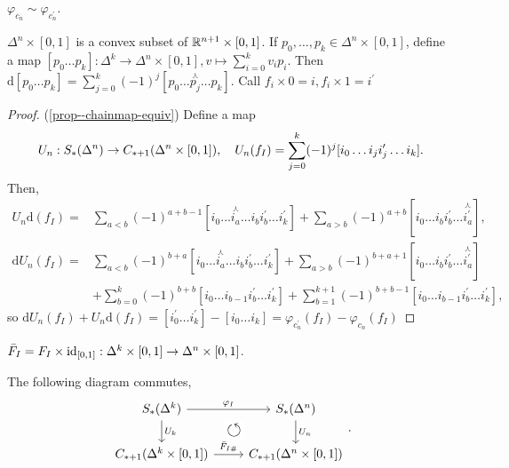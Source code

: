 \documentclass[a4paper,11pt]{article}
\begin{document}
			\begin{prop}\label{prop--chainmap-equiv}
				$\varphi_{c_{n}}\sim\varphi_{c^\prime_n}$.
			\end{prop}

			 $\Delta^n\times[0,1]$ is a convex subset of $\R^{n+1}\times[0,1]$. If $p_0,\dots,p_k\in\Delta^n\times[0,1]$, define a map $[p_0\dots p_k]:\Delta^k\rightarrow \Delta^n\times[0,1],v\mapsto\sum_{i=0}^{k}v_ip_i$. Then $\mathrm{d}[p_0\dots p_k]=\sum_{j=0}^{k}(-1)^{j}[p_0\dots \overset{\curlywedge}{p_j}\dots p_k]$. Call $f_i\times0=i, f_i\times1=i^\prime$

			\begin{proof}(\autoref{prop--chainmap-equiv})
				Define a map
				\begin{equation*}
					U_n:S_\ast(\Delta^n)\rightarrow \cx[\ast+1]{\Delta^n\times[0,1]},\quad U_n(f_I)=\sum_{j=0}^{k}(-1)^{j}[i_0\dots i_j i^\prime_j\dots i_k].
				\end{equation*}
				Then,
				\begin{align*}
					U_n\mathrm{d}(f_I)=&\sum_{a<b}(-1)^{a+b-1}[i_0\dots \overset{\curlywedge}{i_a}\dots i_bi^\prime_b\dots i^\prime_k]+\sum_{a>b}(-1)^{a+b}[i_0\dots i_bi^\prime_b\dots\overset{\curlywedge}{i^\prime_a}],\\
					\mathrm{d}U_n(f_I)=&\sum_{a<b}(-1)^{b+a}[i_0\dots\overset{\curlywedge}{i_a}\dots i_bi^\prime_b\dots i^\prime_k]+\sum_{a>b}(-1)^{b+a+1}[i_0\dots i_bi^\prime_b\dots\overset{\curlywedge}{i^\prime_a}]\\
					&+\sum_{b=0}^k(-1)^{b+b}[i_0\dots i_{b-1}i^\prime_b\dots i^\prime_k]+\sum_{b=1}^{k+1}(-1)^{b+b-1}[i_0\dots i_{b-1}i^\prime_b\dots i^\prime_k],
				\end{align*}
				so $\mathrm{d}U_n(f_I)+U_n\mathrm{d}(f_I)=[i^\prime_0\dots i^\prime_k]-[i_0\dots i_k]=\varphi_{c^\prime_n}(f_I)-\varphi_{c_n}(f_I)$
			\end{proof}

			 $\bar{F}_I=F_I\times\id_{[0,1]}:\Delta^k\times[0,1]\rightarrow \Delta^n\times[0,1]$.

			\begin{lemma}\label{lem--commdiag}
				The following diagram commutes,
				\begin{equation*}
					\begin{tikzcd}
						S_\ast(\Delta^k)\ar[d,"U_k"]\ar[r,"\varphi_I"]& S_\ast(\Delta^n)\ar[d,"U_n"]\\
						\cx[\ast+1]{\Delta^k\times[0,1]}\arrow[ur, phantom, "\scalebox{1.5}{$\circlearrowleft$}" description]\ar[r,"\bar{F}_{I\#}"]& \cx[\ast+1]{\Delta^n\times[0,1]}
					\end{tikzcd}.
				\end{equation*}
			\end{lemma}
\end{document}
